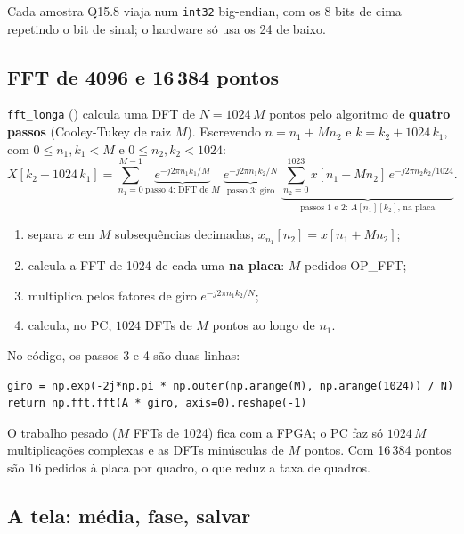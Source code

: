 \documentclass[11pt,a4paper,oneside]{article}
\newcommand{\arq}[1]{{\upshape\ttfamily\detokenize{#1}}}
\begin{document}
Cada amostra Q15.8 viaja num \texttt{int32} big-endian, com os 8 bits de cima
repetindo o bit de sinal; o hardware só usa os 24 de baixo.

\subsection{FFT de 4096 e 16\,384 pontos}
\label{sec:longa}

\texttt{fft\_longa} (\arq{blocos.py:241}) calcula uma DFT de $N = 1024\,M$
pontos pelo algoritmo de \textbf{quatro passos} (Cooley-Tukey de raiz $M$).
Escrevendo $n = n_1 + M n_2$ e $k = k_2 + 1024\,k_1$, com $0 \le n_1, k_1 < M$
e $0 \le n_2, k_2 < 1024$:
\[
  X[k_2 + 1024\,k_1] =
  \sum_{n_1=0}^{M-1}
  \underbrace{e^{-j2\pi n_1 k_1/M}}_{\text{passo 4: DFT de } M}
  \;
  \underbrace{e^{-j2\pi n_1 k_2/N}}_{\text{passo 3: giro}}
  \;
  \underbrace{\sum_{n_2=0}^{1023} x[n_1 + M n_2]\, e^{-j2\pi n_2 k_2/1024}}_{\text{passos 1 e 2: } A[n_1][k_2]\text{, na placa}} .
\]

\begin{enumerate}
\item separa $x$ em $M$ subsequências decimadas, $x_{n_1}[n_2] = x[n_1 + M n_2]$;
\item calcula a FFT de 1024 de cada uma \textbf{na placa}: $M$ pedidos OP\_FFT;
\item multiplica pelos fatores de giro $e^{-j2\pi n_1 k_2/N}$;
\item calcula, no PC, $1024$ DFTs de $M$ pontos ao longo de $n_1$.
\end{enumerate}

No código, os passos 3 e 4 são duas linhas:

\begin{lstlisting}[style=py]
giro = np.exp(-2j*np.pi * np.outer(np.arange(M), np.arange(1024)) / N)
return np.fft.fft(A * giro, axis=0).reshape(-1)
\end{lstlisting}

O trabalho pesado ($M$ FFTs de 1024) fica com a FPGA; o PC faz só $1024\,M$
multiplicações complexas e as DFTs minúsculas de $M$ pontos. Com 16\,384 pontos
são 16 pedidos à placa por quadro, o que reduz a taxa de quadros.

\subsection{A tela: média, fase, salvar}
\end{document}
